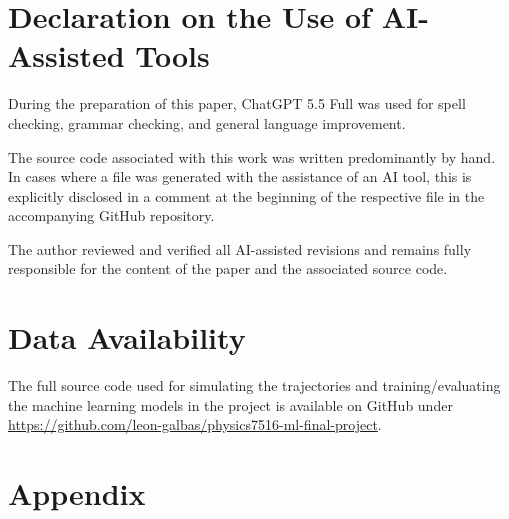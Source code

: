 \documentclass[%
 reprint,
runinaddress,
 amsmath,amssymb,
 aps,
]{revtex4-2}
\begin{document}


\maketitle


















\section*{Declaration on the Use of AI-Assisted Tools}

During the preparation of this paper, ChatGPT 5.5 Full was used for spell checking, grammar checking, and general language improvement.

The source code associated with this work was written predominantly by hand. In cases where a file was generated with the assistance of an AI tool, this is explicitly disclosed in a comment at the beginning of the respective file in the accompanying GitHub repository.

The author reviewed and verified all AI-assisted revisions and remains fully responsible for the content of the paper and the associated source code.

\section*{Data Availability}
The full source code used for simulating the trajectories and training/evaluating the machine learning models in the project is available on GitHub under \url{https://github.com/leon-galbas/physics7516-ml-final-project}.



\section*{Appendix \label{sec:appendix}}
\clearpage

\end{document}
